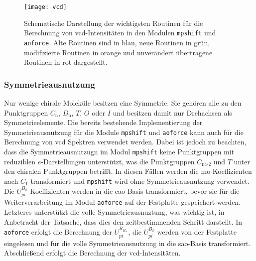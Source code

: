 	\begin{figure}[ht!]
	\centering
	\texttt{[image: vcd]}
	\captionsetup{figurewithin = chapter}
	\captionsetup{font=small, labelfont=bf}\caption[Wichtigste Routinen für die Berechnung von VCD-Intensitäten]{Schematische Darstellung der wichtigsten Routinen für die Berechnung von \ac{vcd}-Intensitäten in den Modulen \texttt{mpshift} und \texttt{aoforce}. Alte Routinen sind in blau, neue Routinen in grün, modifizierte Routinen in orange und unverändert übertragene Routinen in rot dargestellt.}
\label{abb:programmstrukur_vcd}
\end{figure}	   
	
	
	\subsubsection{Symmetrieausnutzung}
	Nur wenige chirale Moleküle besitzen eine Symmetrie. Sie gehören alle zu den Punktgruppen $C_{\textrm{n}}$, $D_{\textrm{n}}$, $T$, $O$ oder $I$ und besitzen damit nur Drehachsen als Symmetrieelemente. Die bereits bestehende Implementierung der Symmetrieausnutzung\supercite{haser1991molecular} für die Module \texttt{mpshift} und \texttt{aoforce} kann auch für die Berechnung von \ac{vcd} Spektren verwendet werden. Dabei ist jedoch zu beachten, dass die Symmetrieausnutzugn im Modul \texttt{mpshift} keine Punktgruppen mit reduziblen $e$-Darstellungen unterstützt, was die Punktgruppen $C_{\textrm{n>2}}$ und $T$ unter den chiralen Punktgruppen betrifft. In diesen Fällen werden die \ac{mo}-Koeffizienten nach $C_1$ transformiert und \texttt{mpshift} wird ohne Symmetrieausnutzung verwendet. Die $U_{pi}^{B_\beta}$ Koeffizienten werden in die \ac{cao}-Basis transformiert, bevor sie für die Weiterverarbeitung im Modul \texttt{aoforce} auf der Festplatte gespeichert werden. Letzteres unterstützt die volle Symmetrieausnuztung, was wichtig ist, in Anbetracht der Tatsache, dass dies den zeitbestimmenden Schritt darstellt. In \texttt{aoforce} erfolgt die Berechnung der $U_{pi}^{R_{K_\alpha}}$, die $U_{pi}^{B_\beta}$ werden von der Festplatte eingelesen und für die volle Symmetrieausnutzung in die \ac{sao}-Basis transformiert. Abschließend erfolgt die Berechnung der \ac{vcd}-Intensitäten. 
